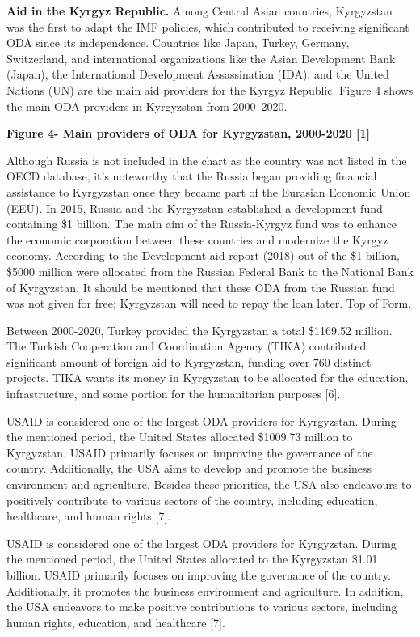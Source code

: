 {\bfseries Aid in the Kyrgyz Republic.} Among Central Asian countries,
Kyrgyzstan was the first to adapt the IMF policies, which contributed to
receiving significant ODA since its independence. Countries like Japan,
Turkey, Germany, Switzerland, and international organizations like the
Asian Development Bank (Japan), the International Development
Assassination (IDA), and the United Nations (UN) are the main aid
providers for the Kyrgyz Republic. Figure 4 shows the main ODA providers
in Kyrgyzstan from 2000--2020.

{\bfseries Figure 4- Main providers of ODA for Kyrgyzstan, 2000-2020
{[}1{]}}

Although Russia is not included in the chart as the country was not
listed in the OECD database, it's noteworthy that the Russia began
providing financial assistance to Kyrgyzstan once they became part of
the Eurasian Economic Union (EEU). In 2015, Russia and the Kyrgyzstan
established a development fund containing \$1 billion. The main aim of
the Russia-Kyrgyz fund was to enhance the economic corporation between
these countries and modernize the Kyrgyz economy. According to the
Development aid report (2018) out of the \$1 billion, \$5000 million
were allocated from the Russian Federal Bank to the National Bank of
Kyrgyzstan. It should be mentioned that these ODA from the Russian fund
was not given for free; Kyrgyzstan will need to repay the loan later.
Top of Form.

Between 2000-2020, Turkey provided the Kyrgyzstan a total \$1169.52
million. The Turkish Cooperation and Coordination Agency (TIKA)
contributed significant amount of foreign aid to Kyrgyzstan, funding
over 760 distinct projects. TIKA wants its money in Kyrgyzstan to be
allocated for the education, infrastructure, and some portion for the
humanitarian purposes {[}6{]}.

USAID is considered one of the largest ODA providers for Kyrgyzstan.
During the mentioned period, the United States allocated \$1009.73
million to Kyrgyzstan. USAID primarily focuses on improving the
governance of the country. Additionally, the USA aims to develop and
promote the business environment and agriculture. Besides these
priorities, the USA also endeavours to positively contribute to various
sectors of the country, including education, healthcare, and human
rights {[}7{]}.

USAID is considered one of the largest ODA providers for Kyrgyzstan.
During the mentioned period, the United States allocated to the
Kyrgyzstan \$1.01 billion. USAID primarily focuses on improving the
governance of the country. Additionally, it promotes the business
environment and agriculture. In addition, the USA endeavors to make
positive contributions to various sectors, including human rights,
education, and healthcare {[}7{]}.

